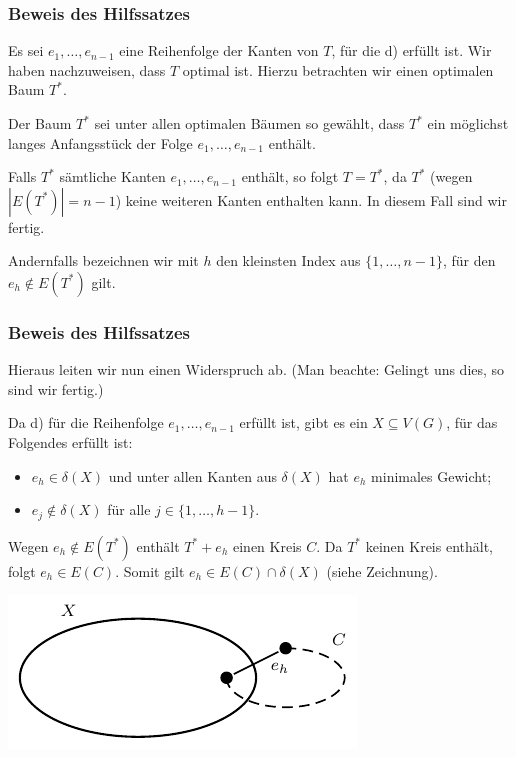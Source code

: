 \documentclass[smaller]{beamer}
\begin{document}
\begin{frame}
\frametitle{Beweis des Hilfssatzes}
 Es sei $e_1,\ldots,e_{n-1}$ eine Reihenfolge der Kanten von $T$, für die d) erfüllt ist. Wir haben nachzuweisen, dass $T$ optimal ist. Hierzu betrachten wir einen optimalen Baum $T^*$. \medskip

Der Baum $T^*$ sei unter allen optimalen Bäumen so gewählt, dass $T^*$ ein \alert{möglichst langes Anfangsstück} der Folge $e_1,\ldots,e_{n-1}$ enthält.\medskip

Falls $T^*$ sämtliche Kanten $e_1,\ldots,e_{n-1}$ enthält, so folgt $T=T^*$, da $T^*$ (wegen $|E(T^*)| = n-1$) keine weiteren Kanten enthalten kann. \alert{In diesem Fall sind wir fertig.} \medskip

\alert{Andernfalls} bezeichnen wir mit $h$ den kleinsten Index aus $\bigl\{ 1,\ldots,n-1 \bigr\}$, für den $e_h \notin E(T^*)$ gilt.

\end{frame}

\begin{frame}
 \frametitle{Beweis des Hilfssatzes}
 \alert{Hieraus leiten wir nun einen Widerspruch ab. (Man beachte: Gelingt uns dies, so sind wir fertig.)} \medskip

Da d) für die Reihenfolge $e_1,\ldots,e_{n-1}$ erfüllt ist, gibt es ein $X \subseteq V(G)$, für das Folgendes erfüllt ist:
\begin{itemize}
	\item $e_h \in \delta(X)$ und unter allen Kanten aus $\delta(X)$ hat $e_h$ minimales Gewicht;
	\item $e_j \notin \delta(X)$ für alle $j \in \{ 1,\ldots,h-1 \}$.
\end{itemize}

\medskip
Wegen $e_h \notin E(T^*)$ enthält $T^*+e_h$ einen Kreis $C$. Da $T^*$ keinen Kreis enthält, folgt $e_h \in E(C)$. Somit gilt $e_h \in E(C) \cap \delta(X)$ (siehe Zeichnung).

\begin{center}
\includegraphics{fig86.pdf}
\end{center}
\end{frame}
\end{document}
